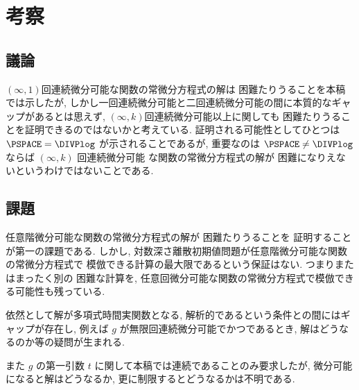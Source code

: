 \section{考察}


\subsection{議論}
$(\infty, 1)$回連続微分可能な関数の常微分方程式の解は \PSPACE 困難たりうることを本稿では示したが,
しかし一回連続微分可能と二回連続微分可能の間に本質的なギャップがあるとは思えず,
$(\infty, k)$回連続微分可能以上に関しても \PSPACE 困難たりうることを証明できるのではないかと考えている.
証明される可能性としてひとつは $\PSPACE = \DIVPlog$ が示されることであるが,
重要なのは $\PSPACE \not = \DIVPlog$ ならば $(\infty, k)$ 回連続微分可能
な関数の常微分方程式の解が \PSPACE 困難になりえないというわけではないことである.


\subsection{課題}

任意階微分可能な関数の常微分方程式の解が \PSPACE 困難たりうることを
証明することが第一の課題である.
しかし, 対数深さ離散初期値問題が任意階微分可能な関数の常微分方程式で
模倣できる計算の最大限であるという保証はない.
つまりまたはまったく別の \PSPACE 困難な計算を,
任意回微分可能な関数の常微分方程式で模倣できる可能性も残っている.

依然として解が多項式時間実関数となる, 解析的であるという条件との間にはギャップが存在し,
例えば $g$ が無限回連続微分可能でかつであるとき, 解はどうなるのか等の疑問が生まれる.

また $g$ の第一引数 $t$ に関して本稿では連続であることのみ要求したが,
微分可能になると解はどうなるか, 更に制限するとどうなるかは不明である.



